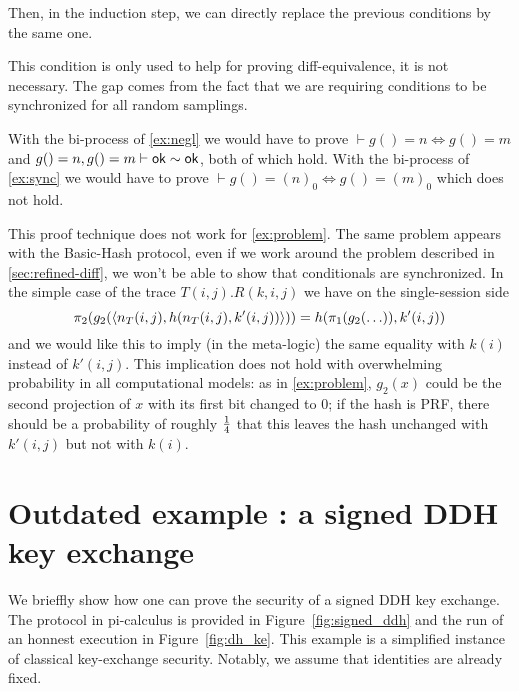 Then, in the induction step, we can directly replace the previous conditions by the same one.


This condition is only used to help for proving diff-equivalence, it is not necessary.
The gap comes from the fact that we are requiring conditions to be
synchronized for all random samplings.

\begin{example}
  With the bi-process of \cref{ex:negl} we would have to prove
  $\vdash g() = n \Leftrightarrow g() = m$ and
  $g()=n, g()=m \vdash \mathsf{ok} \sim \mathsf{ok}$, both of which hold.
  With the bi-process of \cref{ex:sync} we would have to prove
  $\vdash g() = (n)_0 \Leftrightarrow g() = (m)_0$ which does not hold.
\end{example}

\begin{example} \label{ex:indep}
  This proof technique does not work for \cref{ex:problem}.
  The same problem appears with the Basic-Hash protocol, even if we work around
  the problem described in \cref{sec:refined-diff}, we won't be able to show
  that conditionals are synchronized.  In the simple case of the trace
  $T(i,j).R(k,i,j)$ we have
  on the single-session side
  $$\pi_2(g_2(\langle n_T(i,j),h(n_T(i,j),k'(i,j)) \rangle)) =
  h(\pi_1(g_2(\ldots)),k'(i,j))$$
  and we would like this to imply (in the meta-logic)
  the same equality with $k(i)$ instead of $k'(i,j)$.
  This implication does not hold with overwhelming probability in all
  computational models: as in \cref{ex:problem}, $g_2(x)$ could be the second
  projection of $x$ with its first bit changed to $0$; if the hash is PRF,
  there should be a probability of roughly $1 \over 4$ that this leaves
  the hash unchanged with $k'(i,j)$ but not with $k(i)$.
\end{example}

\section{Outdated example : a signed DDH key exchange}

We brieffly show how one can prove the security of a signed DDH key exchange. The protocol in pi-calculus is provided in Figure~\ref{fig:signed_ddh} and the run of an honnest execution in Figure~\ref{fig:dh_ke}. This example is a simplified instance of classical key-exchange security. Notably, we assume that identities are already fixed.

